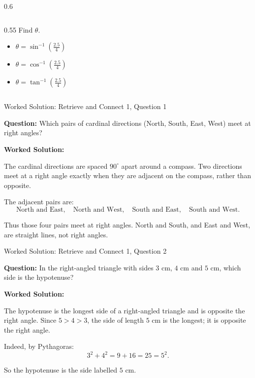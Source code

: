 \documentclass[aspectratio=169]{beamer}
\newcommand{\ashow}[1]{\uncover<2->{\textcolor{red}{\small #1}}}
\begin{document}
\begin{frame}
\begin{columns}[t,onlytextwidth]
\begin{column}{0.6\textwidth}
\begin{columns}[t,onlytextwidth]
\begin{column}{0.55\textwidth}
    Find $\theta$.

     \fontsize{10}{12}\selectfont

    \begin{itemize}
        \item[(A)] $\displaystyle \theta = \sin^{-1}\!\left(\frac{2.5}{4}\right)$
        \item[(B)] $\displaystyle \theta = \cos^{-1}\!\left(\frac{2.5}{4}\right)$
        \item[(C)] $\displaystyle \theta = \tan^{-1}\!\left(\frac{2.5}{4}\right)$
    \end{itemize}

    \ashow{Answer: (A)}

  \end{column}
\end{columns}
\end{column}
\end{columns}

\end{frame}

\begin{frame}{Worked Solution: Retrieve and Connect 1, Question 1}
\hypertarget{work-st1}{}

\textbf{Question:} Which pairs of cardinal directions (North, South, East, West) meet at right angles?

\textbf{Worked Solution:}

The cardinal directions are spaced \(90^\circ\) apart around a compass. Two directions meet at a right angle exactly when they are adjacent on the compass, rather than opposite.

The adjacent pairs are:
\[
\text{North and East},\quad \text{North and West},\quad \text{South and East},\quad \text{South and West}.
\]

Thus those four pairs meet at right angles. North and South, and East and West, are straight lines, not right angles.

\end{frame}

\begin{frame}{Worked Solution: Retrieve and Connect 1, Question 2}

\textbf{Question:} In the right-angled triangle with sides \(3\) cm, \(4\) cm and \(5\) cm, which side is the hypotenuse?

\textbf{Worked Solution:}

The hypotenuse is the longest side of a right-angled triangle and is opposite the right angle. Since \(5 > 4 > 3\), the side of length \(5\) cm is the longest; it is opposite the right angle.

Indeed, by Pythagoras:
\[
3^2 + 4^2 = 9 + 16 = 25 = 5^2.
\]

So the hypotenuse is the side labelled \(5\) cm.

\end{frame}
\end{document}

